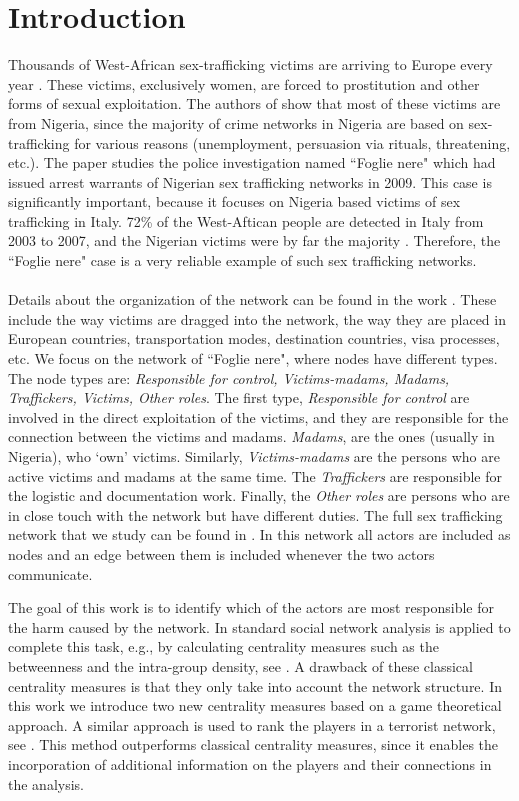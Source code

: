 \documentclass[10p]{article}
\theoremstyle{definition}
\theoremstyle{definition}
\begin{document}
\section{Introduction}
Thousands of West-African sex-trafficking victims are arriving to Europe every year \cite{morselli2009inside}. These victims, exclusively women, are forced to prostitution and other forms of sexual exploitation. The authors of \cite{olagbegi2006human} show that most of these victims are from Nigeria, since the majority of crime networks in Nigeria are based on sex-trafficking for various reasons (unemployment, persuasion via rituals, threatening, etc.). The paper \cite{mancuso2014not} studies the police investigation named ``Foglie nere" which had issued arrest warrants of Nigerian sex trafficking networks in 2009. This case is significantly important, because it focuses on Nigeria based victims of sex trafficking in Italy. 72\% of the West-Aftican people are detected in Italy from 2003 to 2007, and the Nigerian victims were by far the majority \cite{morselli2009inside}. Therefore, the ``Foglie nere" case is a very reliable example of such sex trafficking networks. \\  \\
Details about the organization of the network can be found in the work \cite{mancuso2014not}. These include the way victims are dragged into the network, the way they are placed in European countries, transportation modes, destination countries, visa processes, etc. We focus on the network of ``Foglie nere", where nodes have different types. The node types are: \textit{Responsible for control, Victims-madams, Madams, Traffickers, Victims, Other roles}. The first type, \textit{Responsible for control} are involved in the direct exploitation of the victims, and they are responsible for the connection between the victims and madams. \textit{Madams}, are the ones (usually in Nigeria), who `own' victims. Similarly, \textit{Victims-madams} are the persons who are active victims and madams at the same time. The \textit{Traffickers} are responsible for the logistic and documentation work. Finally, the \textit{Other roles} are persons who are in close touch with the network but have different duties. The full sex trafficking network that we study can be found in \cite{mancuso2014not}. In this network all actors are included as nodes and an edge between them is included whenever the two actors communicate.

The goal of this work is to identify which of the actors are most responsible for the harm caused by the network. In \cite{mancuso2014not} standard social network analysis is applied to complete this task, e.g., by calculating centrality measures such as the betweenness and the intra-group density, see \cite{wasserman1994social}. A drawback of these classical centrality measures is that they only take into account the network structure. In this work we introduce two new centrality measures based on a game theoretical approach. A similar approach is used to rank the players in a terrorist network, see \cite{lindelauf2011game, husslage2015ranking, campen2018new}. This method outperforms classical centrality measures, since it enables the incorporation of additional information on the players and their connections in the analysis.
\end{document}
